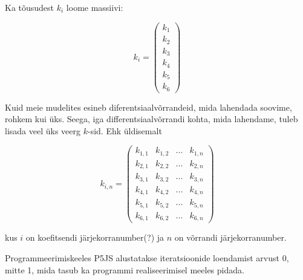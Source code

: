 \begin{flushleft}
Ka tõusudest $k_{i}$ loome massiivi:

\begin{equation}
k_{i}=
\begin{pmatrix}
k_{1}\\
k_{2}\\
k_{3}\\
k_{4}\\
k_{5}\\
k_{6}
\end{pmatrix}
\end{equation}  

Kuid meie mudelites esineb diferentsiaalvõrrandeid, mida lahendada soovime, rohkem kui üks. Seega, iga differentsiaalvõrrandi kohta, mida lahendame, tuleb lisada veel üks veerg $k$-sid. Ehk üldisemalt

\begin{equation}
k_{i,n}=
\begin{pmatrix}
k_{1,1} & k_{1,2} & ...& k_{1,n} \\
k_{2,1}& k_{2,2} & ...& k_{2,n}\\
k_{3,1}& k_{3,2} & ...& k_{3,n}\\
k_{4,1}& k_{4,2} & ...& k_{4,n}\\
k_{5,1}& k_{5,2} & ...& k_{5,n}\\
k_{6,1}& k_{6,2} & ...& k_{6,n}
\end{pmatrix}
\end{equation}  

kus $i$ on koefitsendi järjekorranumber(?) ja $n$ on võrrandi järjekorranumber.

Programmeerimiskeeles P5JS alustatakse iteratsioonide loendamist arvust 0, mitte 1, mida tasub ka programmi realiseerimisel meeles pidada.

\end{flushleft}